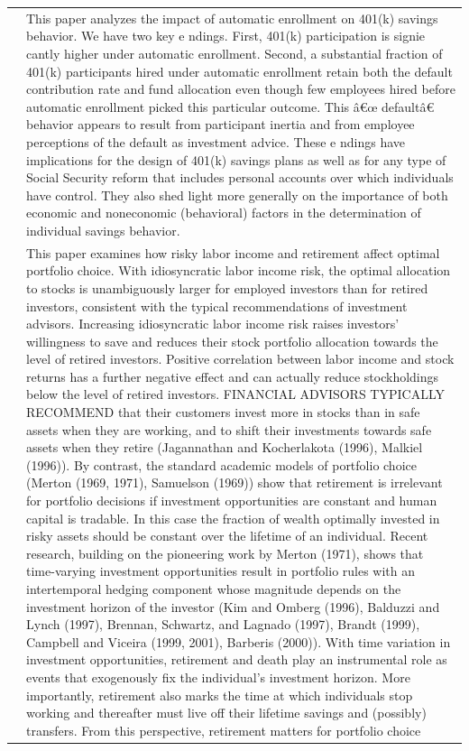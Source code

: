 \documentclass{article}
\begin{document}
\begin{tabular}{p{}p{}}
\cite{Madrian_2001} & This paper analyzes the impact of automatic enrollment on 401(k) savings behavior. We have two key e ndings. First, 401(k) participation is signie cantly higher under automatic enrollment. Second, a substantial fraction of 401(k) participants hired under automatic enrollment retain both the default contribution rate and fund allocation even though few employees hired before automatic enrollment picked this particular outcome. This â€œ defaultâ€ behavior appears to result from participant inertia and from employee perceptions of the default as investment advice. These e ndings have implications for the design of 401(k) savings plans as well as for any type of Social Security reform that includes personal accounts over which individuals have control. They also shed light more generally on the importance of both economic and noneconomic (behavioral) factors in the determination of individual savings behavior. \\
\cite{Viceira_2001} & This paper examines how risky labor income and retirement affect optimal portfolio choice. With idiosyncratic labor income risk, the optimal allocation to stocks is unambiguously larger for employed investors than for retired investors, consistent with the typical recommendations of investment advisors. Increasing idiosyncratic labor income risk raises investors' willingness to save and reduces their stock portfolio allocation towards the level of retired investors. Positive correlation between labor income and stock returns has a further negative effect and can actually reduce stockholdings below the level of retired investors. FINANCIAL ADVISORS TYPICALLY RECOMMEND that their customers invest more in stocks than in safe assets when they are working, and to shift their investments towards safe assets when they retire (Jagannathan and Kocherlakota (1996), Malkiel (1996)). By contrast, the standard academic models of portfolio choice (Merton (1969, 1971), Samuelson (1969)) show that retirement is irrelevant for portfolio decisions if investment opportunities are constant and human capital is tradable. In this case the fraction of wealth optimally invested in risky assets should be constant over the lifetime of an individual. Recent research, building on the pioneering work by Merton (1971), shows that time-varying investment opportunities result in portfolio rules with an intertemporal hedging component whose magnitude depends on the investment horizon of the investor (Kim and Omberg (1996), Balduzzi and Lynch (1997), Brennan, Schwartz, and Lagnado (1997), Brandt (1999), Campbell and Viceira (1999, 2001), Barberis (2000)). With time variation in investment opportunities, retirement and death play an instrumental role as events that exogenously fix the individual's investment horizon. More importantly, retirement also marks the time at which individuals stop working and thereafter must live off their lifetime savings and (possibly) transfers. From this perspective, retirement matters for portfolio choice \\

\end{tabular}
\end{document}
